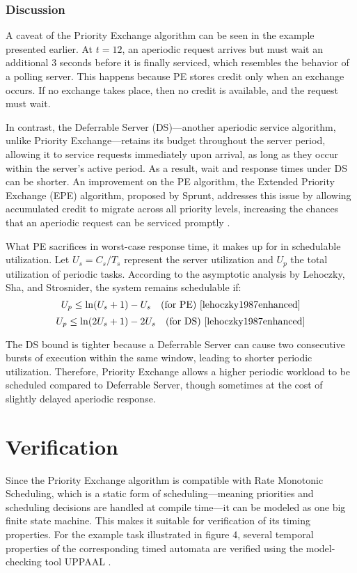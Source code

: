 \documentclass[conference]{IEEEtran}
\begin{document}
\subsubsection*{Discussion}
A caveat of the Priority Exchange algorithm can be seen in the example presented earlier. At $t = 12$, an aperiodic request arrives but must wait an additional 3 seconds before it is finally serviced, which resembles the behavior of a polling server. This happens because PE stores credit only when an exchange occurs. If no exchange takes place, then no credit is available, and the request must wait. 

In contrast, the Deferrable Server (DS)—another aperiodic service algorithm, unlike Priority Exchange—retains its budget throughout the server period, allowing it to service requests immediately upon arrival, as long as they occur within the server's active period. As a result, wait and response times under DS can be shorter. 
An improvement on the PE algorithm, the Extended Priority Exchange (EPE) algorithm, proposed by Sprunt, addresses this issue by allowing accumulated credit to migrate across all priority levels, increasing the chances that an aperiodic request can be serviced promptly \cite{sprunt1990aperiodic}.

What PE sacrifices in worst-case response time, it makes up for in schedulable utilization. Let $U_s = C_s / T_s$ represent the server utilization and $U_p$ the total utilization of periodic tasks. According to the asymptotic analysis by Lehoczky, Sha, and Strosnider, the system remains schedulable if: 
\begin{equation}
U_p \leq \ln(U_s + 1) - U_s \quad \text{(for PE) \cite{lehoczky1987enhanced}}
\end{equation}
\begin{equation}
U_p \leq \ln(2U_s + 1) - 2U_s \quad \text{(for DS) \cite{lehoczky1987enhanced}}
\end{equation}

The DS bound is tighter because a Deferrable Server can cause two consecutive bursts of execution within the same window, leading to shorter periodic utilization. Therefore, Priority Exchange allows a higher periodic workload to be scheduled compared to Deferrable Server, though sometimes at the cost of slightly delayed aperiodic response.

\section{Verification}
Since the Priority Exchange algorithm is compatible with Rate Monotonic Scheduling, which is a static form of scheduling—meaning priorities and scheduling decisions are handled at compile time—it can be modeled as one big finite state machine. This makes it suitable for verification of its timing properties. For the example task illustrated in figure 4, several temporal properties of the corresponding timed automata are verified using the model-checking tool UPPAAL \cite{spuri1996scheduling}.
\end{document}
